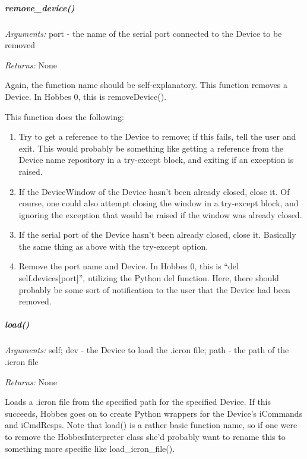 \documentclass[12pt,letterpaper]{article}
\begin{document}
%
%
\subparagraph{remove\_device()}
\label{4.1.1.0.2}

\emph{Arguments:} port - the name of the serial port connected to the Device to be removed

\emph{Returns:} None

Again, the function name should be self-explanatory. This function removes a Device. In Hobbes 0, this is removeDevice().

This function does the following:

\begin{enumerate}

\item Try to get a reference to the Device to remove; if this fails, tell the user and exit. This would probably be something like getting a reference from the Device name repository in a try-except block, and exiting if an exception is raised.

\item If the DeviceWindow of the Device hasn't been already closed, close it. Of course, one could also attempt closing the window in a try-except block, and ignoring the exception that would be raised if the window was already closed.

\item If the serial port of the Device hasn't been already closed, close it. Basically the same thing as above with the try-except option.

\item Remove the port name and Device. In Hobbes 0, this is ``del self.devices[port]'', utilizing the Python del function. Here, there should probably be some sort of notification to the user that the Device had been removed.

\end{enumerate}



%
%
\subparagraph{load()}
\label{4.1.1.0.3}

\emph{Arguments:} self; dev - the Device to load the .icron file; path - the path of the .icron file

\emph{Returns:} None

Loads a .icron file from the specified path for the specified Device. If this succeeds, Hobbes goes on to create Python wrappers for the Device's iCommands and iCmdResps. Note that load() is a rather basic function name, so if one were to remove the HobbesInterpreter class she'd probably want to rename this to something more specific like load\_icron\_file().
\end{document}
